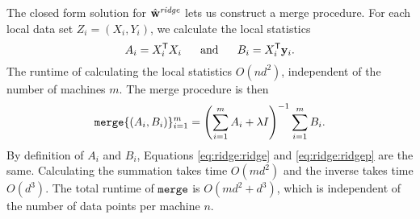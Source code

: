 \documentclass[thesis.tex]{subfiles}
\newcommand{\merge}{\mkprocedure{merge}}
\newcommand{\wridge}{\hat\w^\textit{ridge}}
\newcommand{\wridgep}{\hat\w^\textit{ridge,par}}
\begin{document}
The closed form solution for $\wridge$ lets us construct a merge procedure.
For each local data set $Z_i=(X_i, Y_i)$, we calculate the local statistics
\begin{equation}
    A_i = {X}^{\mathsf{T}}_i X_i
    ~~~~~\text{and}~~~~~
    B_i = {X}^{\mathsf{T}}_i \mathbf{y}_i
    .
\end{equation}
The runtime of calculating the local statistics $O(nd^2)$, independent of the number of machines $m$.
The merge procedure is then
\begin{equation}
    \label{eq:ridge:ridgep}
    \merge\{(A_i,B_i)\}_{i=1}^m
    = \left(\sum_{i=1}^m A_i + \lambda I\right)^{-1} \sum_{i=1}^m B_i
    .
\end{equation}
By definition of $A_i$ and $B_i$,
Equations \eqref{eq:ridge:ridge} and \eqref{eq:ridge:ridgep} are the same.
Calculating the summation takes time $O(md^2)$ and the inverse takes time $O(d^3)$.
The total runtime of $\merge$ is $O(md^2+d^3)$,
which is independent of the number of data points per machine $n$.


%
%
%

\end{document}
